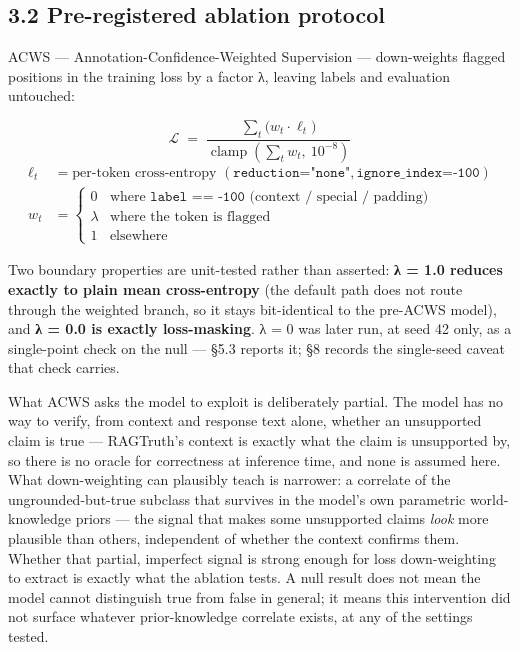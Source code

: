 \documentclass[11pt]{article}
\newcounter{none}
\begin{document}
\subsection{3.2 Pre-registered ablation protocol}\label{pre-registered-ablation-protocol}

ACWS --- Annotation-Confidence-Weighted Supervision --- down-weights flagged positions in the
training loss by a factor λ, leaving labels and evaluation untouched:

\begin{equation*}
\mathcal{L} \;=\; \frac{\sum_t \big(w_t \cdot \ell_t\big)}{\operatorname{clamp}\!\left(\sum_t w_t,\ 10^{-8}\right)}
\end{equation*}
\begin{align*}
\ell_t &= \text{per-token cross-entropy } (\texttt{reduction="none"}, \texttt{ignore\_index=-100}) \\
w_t &=
\begin{cases}
0 & \text{where } \texttt{label == -100} \text{ (context / special / padding)} \\
\lambda & \text{where the token is flagged} \\
1 & \text{elsewhere}
\end{cases}
\end{align*}

Two boundary properties are unit-tested rather than asserted: \textbf{λ = 1.0 reduces exactly to
plain mean cross-entropy} (the default path does not route through the weighted branch, so
it stays bit-identical to the pre-ACWS model), and \textbf{λ = 0.0 is exactly loss-masking}.
λ = 0 was later run, at seed 42 only, as a single-point check on the null --- §5.3 reports
it; §8 records the single-seed caveat that check carries.

What ACWS asks the model to exploit is deliberately partial. The model has no way to
verify, from context and response text alone, whether an unsupported claim is true ---
RAGTruth's context is exactly what the claim is unsupported by, so there is no oracle for
correctness at inference time, and none is assumed here. What down-weighting can plausibly
teach is narrower: a correlate of the ungrounded-but-true subclass that survives in the
model's own parametric world-knowledge priors --- the signal that makes some unsupported
claims \emph{look} more plausible than others, independent of whether the context confirms them.
Whether that partial, imperfect signal is strong enough for loss down-weighting to extract
is exactly what the ablation tests. A null result does not mean the model cannot distinguish
true from false in general; it means this intervention did not surface whatever
prior-knowledge correlate exists, at any of the settings tested.
\end{document}
